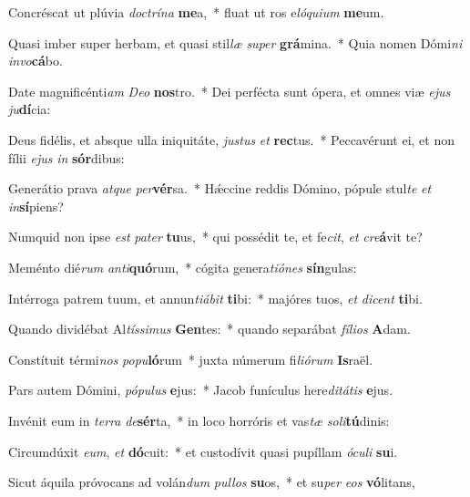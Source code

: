\item Concréscat ut plúvia \textit{doc}\textit{trí}\textit{na} \textbf{me}a,~* fluat ut ros e\textit{ló}\textit{qui}\textit{um} \textbf{me}um.
\item Quasi imber super herbam, et quasi stil\textit{læ} \textit{su}\textit{per} \textbf{grá}mina.~* Quia nomen Dómi\textit{ni} \textit{in}\textit{vo}\textbf{cá}bo.
\item Date magnificénti\textit{am} \textit{De}\textit{o} \textbf{nos}tro.~* Dei perfécta sunt ópera, et omnes viæ \textit{e}\textit{jus} \textit{ju}\textbf{dí}cia:
\item Deus fidélis, et absque ulla iniquitáte, \textit{jus}\textit{tus} \textit{et} \textbf{rec}tus.~* Peccavérunt ei, et non fílii \textit{e}\textit{jus} \textit{in} \textbf{sór}dibus:
\item Generátio prava \textit{at}\textit{que} \textit{per}\textbf{vér}sa.~* Hǽccine reddis Dómino, pópule stul\textit{te} \textit{et} \textit{in}\textbf{sí}piens?
\item Numquid non ipse \textit{est} \textit{pa}\textit{ter} \textbf{tu}us,~* qui possédit te, et fe\textit{cit}, \textit{et} \textit{cre}\textbf{á}vit te?
\item Meménto dié\textit{rum} \textit{an}\textit{ti}\textbf{quó}rum,~* cógita genera\textit{ti}\textit{ó}\textit{nes} \textbf{sín}gulas:
\item Intérroga patrem tuum, et annun\textit{ti}\textit{á}\textit{bit} \textbf{ti}bi:~* majóres tuos, \textit{et} \textit{di}\textit{cent} \textbf{ti}bi.
\item Quando dividébat Al\textit{tís}\textit{si}\textit{mus} \textbf{Gen}tes:~* quando separábat \textit{fí}\textit{li}\textit{os} \textbf{A}dam.
\item Constítuit térmi\textit{nos} \textit{po}\textit{pu}\textbf{ló}rum~* juxta númerum fi\textit{li}\textit{ó}\textit{rum} \textbf{Is}raël.
\item Pars autem Dómini, \textit{pó}\textit{pu}\textit{lus} \textbf{e}jus:~* Jacob funículus here\textit{di}\textit{tá}\textit{tis} \textbf{e}jus.
\item Invénit eum in \textit{ter}\textit{ra} \textit{de}\textbf{sér}ta,~* in loco horróris et vas\textit{tæ} \textit{so}\textit{li}\textbf{tú}dinis:
\item Circumdúxit \textit{e}\textit{um}, \textit{et} \textbf{dó}cuit:~* et custodívit quasi pupíllam \textit{ó}\textit{cu}\textit{li} \textbf{su}i.
\item Sicut áquila próvocans ad volán\textit{dum} \textit{pul}\textit{los} \textbf{su}os,~* et su\textit{per} \textit{e}\textit{os} \textbf{vó}litans,
